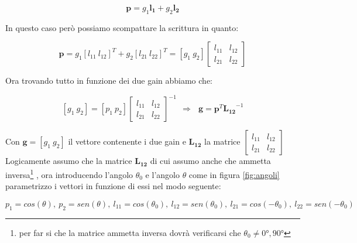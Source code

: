 \documentclass[12pt,a4paper]{report}
\begin{document}
\begin{equation}
\boldsymbol{p}= g_1 \boldsymbol{l_{1}} + g_2 \boldsymbol{l_{2}} %
\label{eq:bbbb}
\end{equation}

In questo caso però possiamo scompattare la scrittura in quanto:

\begin{equation}
\boldsymbol{p}=g_1 {\left[ l_{11} \ l_{12} \right]}^T + g_2 {\left[ l_{21} \ l_{22} \right]}^T= \left[ g_1 \ g_2 \right] \left[\begin{matrix}
l_{11} & l_{12}\\ l_{21} & l_{22}
\end{matrix} \right]
\label{eq:cccc}
\end{equation}

Ora trovando tutto in funzione dei due gain abbiamo che:

\begin{equation}
\left[g_1 \ g_2\right] = \left[ p_1 \ p_2 \right]  {\left[\begin{matrix}
l_{11} & l_{12}\\ l_{21} & l_{22}
\end{matrix} \right]}^{-1} \ \ \Rightarrow \ \ \ \boldsymbol{g}=\boldsymbol{p}^T {\boldsymbol{L_{12}}}^{-1}
\label{eq:dddd}
\end{equation}

Con $\boldsymbol{g}= \left[ g_1 \ g_2 \right]$ il vettore contenente i due gain e $\boldsymbol{L_{12}}$ la matrice $\left[\begin{matrix}
l_{11} & l_{12}\\ l_{21} & l_{22}
\end{matrix}\right]$ Logicamente assumo che la matrice $\boldsymbol{L_{12}}$ di cui assumo anche che ammetta inversa\footnote{per far si che la matrice ammetta inversa dovrà verificarsi che $\theta_0\neq 0°,90°$} , ora introducendo l'angolo $\theta_0$ e l'angolo $\theta$ come in figura \ref{fig:angoli} parametrizzo i vettori in funzione di essi nel modo seguente:

\[ p_1=cos(\theta),\ p_2=sen(\theta),\ l_{11}=cos(\theta_0),\ l_{12}=sen(\theta_0),\ l_{21}=cos(-\theta_0),\ l_{22}=sen(-\theta_0) \]
\end{document}
